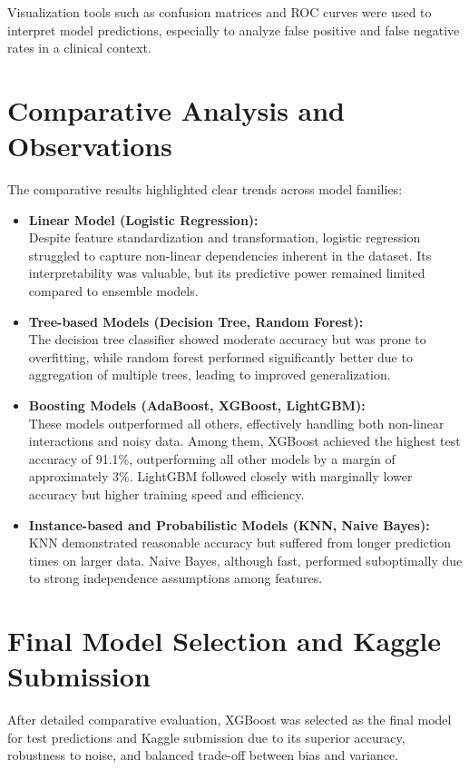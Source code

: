 Visualization tools such as confusion matrices and ROC curves were used to interpret model predictions, especially to analyze false positive and false negative rates in a clinical context.


\section{Comparative Analysis and Observations}\label{sec:comparative-analysis-and-observations}
The comparative results highlighted clear trends across model families:

\begin{itemize}
    \item \textbf{Linear Model (Logistic Regression):}\\
    Despite feature standardization and transformation, logistic regression struggled to capture non-linear dependencies inherent in the dataset.
    Its interpretability was valuable, but its predictive power remained limited compared to ensemble models.

    \item \textbf{Tree-based Models (Decision Tree, Random Forest):}\\
    The decision tree classifier showed moderate accuracy but was prone to overfitting, while random forest performed significantly better due to aggregation of multiple trees, leading to improved generalization.

    \item \textbf{Boosting Models (AdaBoost, XGBoost, LightGBM):}\\
    These models outperformed all others, effectively handling both non-linear interactions and noisy data.
    Among them, XGBoost achieved the highest test accuracy of 91.1\%, outperforming all other models by a margin of approximately 3\%.
    LightGBM followed closely with marginally lower accuracy but higher training speed and efficiency.

    \item \textbf{Instance-based and Probabilistic Models (KNN, Naive Bayes):}\\
    KNN demonstrated reasonable accuracy but suffered from longer prediction times on larger data.
    Naive Bayes, although fast, performed suboptimally due to strong independence assumptions among features.
\end{itemize}


\section{Final Model Selection and Kaggle Submission}\label{sec:final-model-selection-and-kaggle-submission}
After detailed comparative evaluation, XGBoost was selected as the final model for test predictions and Kaggle submission due to its superior accuracy, robustness to noise, and balanced trade-off between bias and variance.

